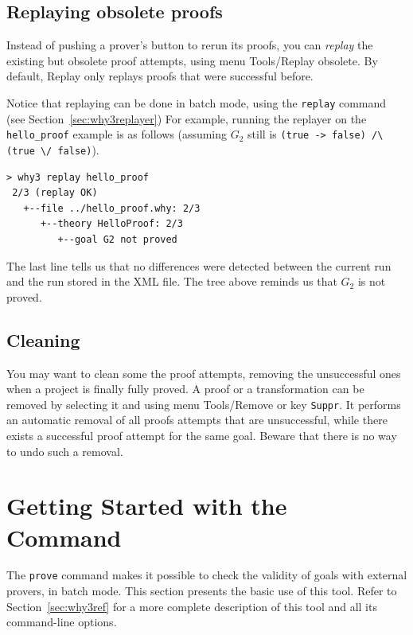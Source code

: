 \subsection{Replaying obsolete proofs}

Instead of pushing a prover's button to rerun its proofs, you can
\emph{replay} the existing but obsolete
proof attempts, using menu
\textsf{Tools/Replay obsolete}. By default, \textsf{Replay} only replays
proofs that were successful before.

Notice that replaying can be done in batch mode, using the
\texttt{replay} command (see Section~\ref{sec:why3replayer}) For
example, running the replayer on the \texttt{hello\_proof} example is
as follows (assuming $G_2$ still is
\lstinline|(true -> false) /\ (true \/ false)|).
\begin{verbatim}
> why3 replay hello_proof
 2/3 (replay OK)
   +--file ../hello_proof.why: 2/3
      +--theory HelloProof: 2/3
         +--goal G2 not proved
\end{verbatim}
The last line tells us that no differences were detected between the
current run and the run stored in the XML file. The tree above
reminds us that $G_2$ is not proved.

\subsection{Cleaning}

You may want to clean some the proof attempts, \eg removing the
unsuccessful ones when a project is finally fully proved.
A proof or a transformation can be removed by selecting it and
using menu \textsf{Tools/Remove} or key \texttt{Suppr}.
It performs an automatic removal of all proofs
attempts that are unsuccessful, while there exists a successful proof
attempt for the same goal.
Beware that there is no way to undo such a removal.

\section{Getting Started with the \why Command}
\label{sec:batch}

The \texttt{prove} command makes it possible to check the validity of goals with external
provers, in batch mode. This section presents the basic use of this
tool. Refer to Section~\ref{sec:why3ref} for a more complete
description of this tool and all its command-line options.

